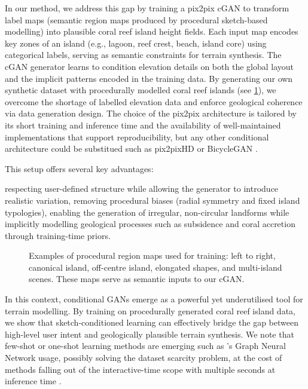 \midConclusion

In our method, we address this gap by training a pix2pix cGAN to transform label maps (semantic region maps produced by procedural sketch-based modelling) into plausible coral reef island height fields. Each input map encodes key zones of an island (e.g., lagoon, reef crest, beach, island core) using categorical labels, serving as semantic constraints for terrain synthesis. The cGAN generator learns to condition elevation details on both the global layout and the implicit patterns encoded in the training data. By generating our own synthetic dataset with procedurally modelled coral reef islands (see \cref{fig:coral-island-difficulties-dataset}), we overcome the shortage of labelled elevation data and enforce geological coherence via data generation design. The choice of the pix2pix architecture is tailored by its short training and inference time and the availability of well-maintained implementations that support reproducibility, but any other conditional architecture could be substitued such as pix2pixHD or BicycleGAN \cite{Wang2018,Zhu2018NN}.

This setup offers several key advantages: 
\begin{Itemize}
    \Item{} respecting user-defined structure while allowing the generator to introduce realistic variation,
    \Item{} removing procedural biases (radial symmetry and fixed island typologies),
    \Item{} enabling the generation of irregular, non-circular landforms while implicitly modelling geological processes such as subsidence and coral accretion through training-time priors.
\end{Itemize}


\begin{figure}
    \caption[Examples of procedural region maps used for training a cGAN]{Examples of procedural region maps used for training: left to right, canonical island, off-centre island, elongated shapes, and multi-island scenes. These maps serve as semantic inputs to our cGAN.}
    \label{fig:coral-island-difficulties-dataset}
\end{figure}


\bigConclusion

In this context, conditional GANs emerge as a powerful yet underutilised tool for terrain modelling. By training on procedurally generated coral reef island data, we show that sketch-conditioned learning can effectively bridge the gap between high-level user intent and geologically plausible terrain synthesis. We note that few-shot or one-shot learning methods are emerging such as 's Graph Neural Network usage, possibly solving the dataset scarcity problem, at the cost of methods falling out of the interactive-time scope with multiple seconds at inference time \cite{Liu2025}.




